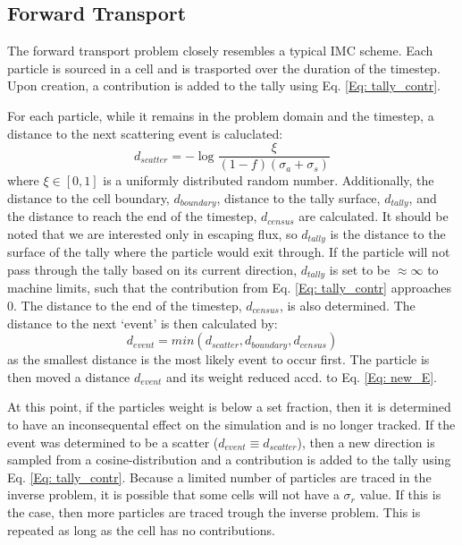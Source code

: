 \documentclass[]{article}
\begin{document}
  	\subsection{Forward Transport}
  		The forward transport problem closely resembles a typical IMC scheme. Each particle is sourced in a cell and is trasported over the duration of the timestep. Upon creation, a contribution is added to the tally using Eq. \ref{Eq: tally_contr}. 
  		
  		For each particle, while it remains in the problem domain and the timestep, a distance to the next scattering event is caluclated:
  		\begin{equation}
  			d_{scatter} = -\log{\frac{\xi}{(1 - f)(\sigma_{a} + \sigma_{s})}}
  		\end{equation}
  		where $\xi \in [0,1]$ is a uniformly distributed random number. Additionally, the distance to the cell boundary, $d_{boundary}$, distance to the tally surface, $d_{tally}$, and the distance to reach the end of the timestep, $d_{census}$ are calculated. It should be noted that we are interested only in escaping flux, so $d_{tally}$ is the distance to the surface of the tally where the particle would exit through. If the particle will not pass through the tally based on its current direction, $d_{tally}$ is set to be $\approx \infty$ to machine limits, such that the contribution from Eq. \ref{Eq: tally_contr} approaches $0$. The distance to the end of the timestep, $d_{census}$, is also determined. The distance to the next `event' is then calculated by:
  		\begin{equation}
  			d_{event} = min(d_{scatter}, d_{boundary}, d_{census})
  		\end{equation}
  		as the smallest distance is the most likely event to occur first. The particle is then moved a distance $d_{event}$ and its weight reduced accd. to Eq. \ref{Eq: new_E}. 
  		
  		At this point, if the particles weight is below a set fraction, then it is determined to have an inconsequental effect on the simulation and is no longer tracked. If the event was determined to be a scatter ($d_{event} \equiv d_{scatter}$), then a new direction is sampled from a cosine-distribution and a contribution is added to the tally using Eq. \ref{Eq: tally_contr}. Because a limited number of particles are traced in the inverse problem, it is possible that some cells will not have a $\sigma_{r}$ value. If this is the case, then more particles are traced trough the inverse problem. This is repeated as long as the cell has no contributions. 
  		
\end{document}
